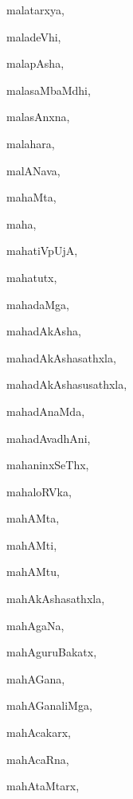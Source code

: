 \begin{multicols}{3}
{\noindent
{malatarxya}, \pageref{malatarxya}

\noindent
{maladeVhi}, \pageref{maladeVhi}

\noindent
{malapAsha}, \pageref{malapAsha}

\noindent
{malasaMbaMdhi}, \pageref{malasaMbaMdhi}

\noindent
{malasAnxna}, \pageref{malasAnxna}

\noindent
{malahara}, \pageref{malahara}

\noindent
{malANava}, \pageref{malANava}

\noindent
{mahaMta}, \pageref{mahaMta}

\noindent
{maha}, \pageref{maha}

\noindent
{mahatiVpUjA}, \pageref{mahatiVpUjA}

\noindent
{mahatutx}, \pageref{mahatutx}

\noindent
{mahadaMga}, \pageref{mahadaMga}

\noindent
{mahadAkAsha}, \pageref{mahadAkAsha}

\noindent
{mahadAkAshasathxla}, \pageref{mahadAkAshasathxla}

\noindent
{mahadAkAshasusathxla}, \pageref{mahadAkAshasusathxla}

\noindent
{mahadAnaMda}, \pageref{mahadAnaMda}

\noindent
{mahadAvadhAni}, \pageref{mahadAvadhAni}

\noindent
{mahaninxSeThx}, \pageref{mahaninxSeThx}

\noindent
{mahaloRVka}, \pageref{mahaloRVka}

\noindent
{mahAMta}, \pageref{mahAMta}

\noindent
{mahAMti}, \pageref{mahAMti}

\noindent
{mahAMtu}, \pageref{mahAMtu}

\noindent
{mahAkAshasathxla}, \pageref{mahAkAshasathxla}

\noindent
{mahAgaNa}, \pageref{mahAgaNa}

\noindent
{mahAguruBakatx}, \pageref{mahAguruBakatx}

\noindent
{mahAGana}, \pageref{mahAGana}

\noindent
{mahAGanaliMga}, \pageref{mahAGanaliMga}

\noindent
{mahAcakarx}, \pageref{mahAcakarx}

\noindent
{mahAcaRna}, \pageref{mahAcaRna}

\noindent
{mahAtaMtarx}, \pageref{mahAtaMtarx}

}
\end{multicols}
